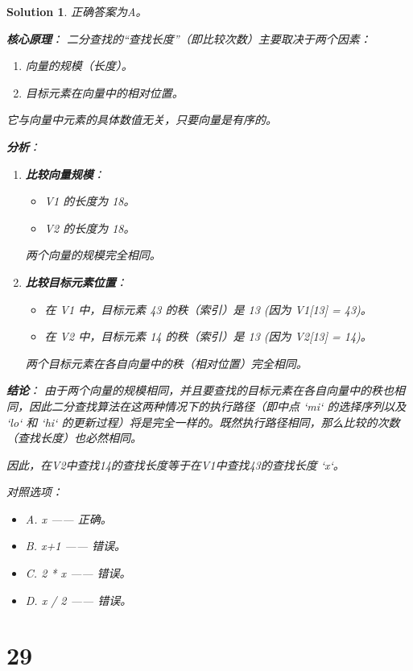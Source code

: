 \documentclass[UTF8]{report}
\newtheorem{solution}{Solution}
\theoremstyle{MyLineTheoremStyle} %
\theoremstyle{MyBlockTheoremStyle} %
\theoremstyle{MySubsubsectionStyle} %
\begin{document}
\begin{solution}
正确答案为A。

\textbf{核心原理}：
二分查找的“查找长度”（即比较次数）主要取决于两个因素：
\begin{enumerate}
    \item 向量的规模（长度）。
    \item 目标元素在向量中的相对位置。
\end{enumerate}
它与向量中元素的具体数值无关，只要向量是有序的。

\textbf{分析}：
\begin{enumerate}
    \item \textbf{比较向量规模}：
    \begin{itemize}
        \item V1 的长度为 18。
        \item V2 的长度为 18。
    \end{itemize}
    两个向量的规模完全相同。

    \item \textbf{比较目标元素位置}：
    \begin{itemize}
        \item 在 V1 中，目标元素 43 的秩（索引）是 13 (因为 V1[13] = 43)。
        \item 在 V2 中，目标元素 14 的秩（索引）是 13 (因为 V2[13] = 14)。
    \end{itemize}
    两个目标元素在各自向量中的秩（相对位置）完全相同。
\end{enumerate}

\textbf{结论}：
由于两个向量的规模相同，并且要查找的目标元素在各自向量中的秩也相同，因此二分查找算法在这两种情况下的执行路径（即中点 `mi` 的选择序列以及 `lo` 和 `hi` 的更新过程）将是完全一样的。既然执行路径相同，那么比较的次数（查找长度）也必然相同。

因此，在V2中查找14的查找长度等于在V1中查找43的查找长度 `x`。

对照选项：
\begin{itemize}
    \item A. x —— 正确。
    \item B. x+1 —— 错误。
    \item C. 2 * x —— 错误。
    \item D. x / 2 —— 错误。
\end{itemize}
\end{solution}



\section*{29}
\end{document}
